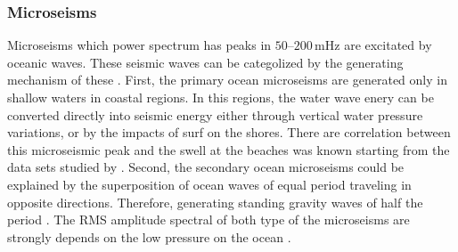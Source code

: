 \subsubsection{Microseisms}
Microseisms which power spectrum has peaks in $50$--$200\,\mathrm{mHz}$ are excitated by oceanic waves. These seismic waves can be categolized by the generating mechanism of these \cite{Bormann2012new}. First, the primary ocean microseisms are generated only in shallow waters in coastal regions. In this regions, the water wave enery can be converted directly into seismic energy either through vertical water pressure variations, or by the impacts of surf on the shores. There are correlation between this microseismic peak and the swell at the beaches was known starting from the data sets studied by \cite{haubrich1963comparative}. Second, the secondary ocean microseisms could be explained by the superposition of ocean waves of equal period traveling in opposite directions. Therefore, generating standing gravity waves of half the period \cite{longuet1950theory}. The RMS amplitude spectral of both type of the microseisms are strongly depends on the low pressure on the ocean \cite{naticchioni2014microseismic}. 

